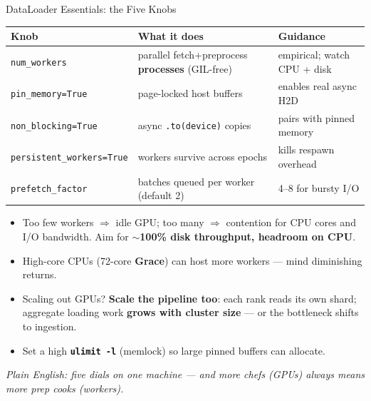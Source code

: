 \documentclass[aspectratio=169]{beamer}
\newcommand{\kw}[1]{\textbf{\textcolor{kwblue}{#1}}}
\newcommand{\pe}[1]{\par{\setlength{\fboxsep}{2.5pt}\noindent\colorbox{navy!9}{\parbox{\dimexpr\textwidth-5pt\relax}{\footnotesize\itshape Plain English: #1}}}}
\begin{document}
\begin{frame}{DataLoader Essentials: the Five Knobs}
  \begingroup\footnotesize\setlength{\tabcolsep}{4pt}\renewcommand{\arraystretch}{1.2}
  \begin{tabular}{@{}lll@{}}
    \toprule
    \textbf{Knob} & \textbf{What it does} & \textbf{Guidance} \\
    \midrule
    \texttt{num\_workers} & parallel fetch+preprocess \kw{processes} (GIL-free) & empirical; watch CPU + disk \\
    \texttt{pin\_memory=True} & page-locked host buffers & enables real async H2D \\
    \texttt{non\_blocking=True} & async \texttt{.to(device)} copies & pairs with pinned memory \\
    \texttt{persistent\_workers=True} & workers survive across epochs & kills respawn overhead \\
    \texttt{prefetch\_factor} & batches queued per worker (default 2) & 4--8 for bursty I/O \\
    \bottomrule
  \end{tabular}\endgroup
  \medskip
  \begin{itemize}\small
    \item Too few workers $\Rightarrow$ idle GPU; too many $\Rightarrow$ contention for CPU
          cores and I/O bandwidth. Aim for \kw{$\sim$100\% disk throughput, headroom on CPU}.
    \item High-core CPUs (72-core \kw{Grace}) can host more workers --- mind diminishing returns.
    \item Scaling out GPUs? \kw{Scale the pipeline too}: each rank reads its own shard; aggregate
          loading work \kw{grows with cluster size} --- or the bottleneck shifts to ingestion.
    \item Set a high \kw{\texttt{ulimit -l}} (memlock) so large pinned buffers can allocate.
  \end{itemize}
  \pe{five dials on one machine --- and more chefs (GPUs) always means more prep cooks (workers).}
\end{frame}
\end{document}
